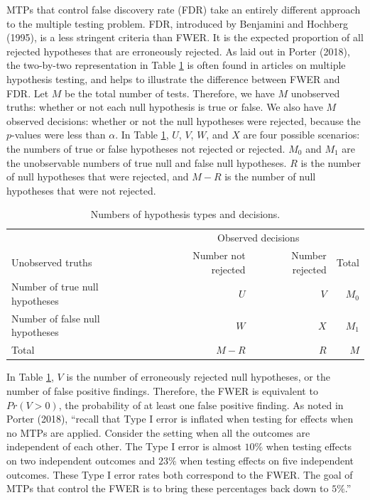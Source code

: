 \documentclass{article}
\begin{document}
MTPs that control false discovery rate (FDR) take an entirely different
approach to the multiple testing problem. FDR, introduced by Benjamini
and Hochberg (1995), is a less stringent criteria than FWER. It is the
expected proportion of all rejected hypotheses that are erroneously
rejected. As laid out in Porter (2018), the two-by-two representation in
Table \ref{tab:twobytwo} is often found in articles on multiple
hypothesis testing, and helps to illustrate the difference between FWER
and FDR. Let \(M\) be the total number of tests. Therefore, we have
\(M\) unobserved truths: whether or not each null hypothesis is true or
false. We also have \(M\) observed decisions: whether or not the null
hypotheses were rejected, because the \(p\)-values were less than
\(\alpha\). In Table \ref{tab:twobytwo}, \(U\), \(V\), \(W\), and \(X\)
are four possible scenarios: the numbers of true or false hypotheses not
rejected or rejected. \(M_0\) and \(M_1\) are the unobservable numbers
of true null and false null hypotheses. \(R\) is the number of null
hypotheses that were rejected, and \(M - R\) is the number of null
hypotheses that were not rejected.

\begin{table}[h!]
\centering
\begin{tabular}{l r r r}
\toprule
                                      & \multicolumn{3}{c}{Observed decisions}\\
Unobserved truths                     & Number not rejected     & Number rejected   & Total \\ \midrule
Number of true null hypotheses        & $U$                     & $V$               & $M_0$ \\
Number of false null hypotheses       & $W$                     & $X$               & $M_1$ \\ \hline
Total                                 & $M-R$                   & $R$               & $M$ \\
\bottomrule
\end{tabular}
\caption{Numbers of hypothesis types and decisions.}
  \label{tab:twobytwo}
\end{table}

In Table \ref{tab:twobytwo}, \(V\) is the number of erroneously rejected
null hypotheses, or the number of false positive findings. Therefore,
the FWER is equivalent to \(Pr(V > 0)\), the probability of at least one
false positive finding. As noted in Porter (2018), ``recall that Type I
error is inflated when testing for effects when no MTPs are applied.
Consider the setting when all the outcomes are independent of each
other. The Type I error is almost \(10\%\) when testing effects on two
independent outcomes and \(23\%\) when testing effects on five
independent outcomes. These Type I error rates both correspond to the
FWER. The goal of MTPs that control the FWER is to bring these
percentages back down to \(5\%\).''
\end{document}
